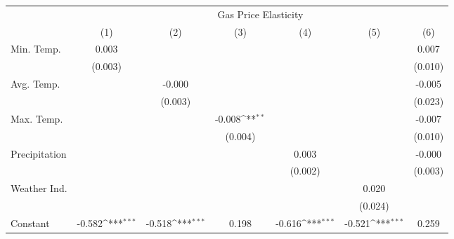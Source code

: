 {
\def\sym#1{\ifmmode^{#1}\else\(^{#1}\)\fi}
\begin{tabular}{l*{6}{c}}
\hline\hline
            &\multicolumn{6}{c}{Gas Price Elasticity}                                                                                           \\
            &\multicolumn{1}{c}{(1)}         &\multicolumn{1}{c}{(2)}         &\multicolumn{1}{c}{(3)}         &\multicolumn{1}{c}{(4)}         &\multicolumn{1}{c}{(5)}         &\multicolumn{1}{c}{(6)}         \\
\hline
Min. Temp.  &       0.003         &                     &                     &                     &                     &       0.007         \\
            &     (0.003)         &                     &                     &                     &                     &     (0.010)         \\
[1em]
Avg. Temp.  &                     &      -0.000         &                     &                     &                     &      -0.005         \\
            &                     &     (0.003)         &                     &                     &                     &     (0.023)         \\
[1em]
Max. Temp.  &                     &                     &      -0.008\sym{**} &                     &                     &      -0.007         \\
            &                     &                     &     (0.004)         &                     &                     &     (0.010)         \\
[1em]
Precipitation&                     &                     &                     &       0.003         &                     &      -0.000         \\
            &                     &                     &                     &     (0.002)         &                     &     (0.003)         \\
[1em]
Weather Ind.&                     &                     &                     &                     &       0.020         &                     \\
            &                     &                     &                     &                     &     (0.024)         &                     \\
[1em]
Constant    &      -0.582\sym{***}&      -0.518\sym{***}&       0.198         &      -0.616\sym{***}&      -0.521\sym{***}&       0.259         \\

\end{tabular}}
